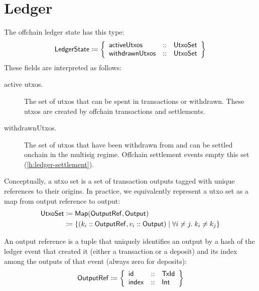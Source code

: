 \documentclass[../hydrozoa.tex]{subfiles}
\begin{document}
\section{Ledger}%
\label{h:offchain-ledger}

The offchain ledger state has this type:
\begin{equation*}
  \mathsf{LedgerState} \coloneq \left\{
  \begin{array}{lll}
    \mathsf{activeUtxos} &::& \mathsf{UtxoSet} \\
    \mathsf{withdrawnUtxos} &::& \mathsf{UtxoSet}
  \end{array}\right\}
\end{equation*}
These fields are interpreted as follows:
\begin{description}
  \item[active utxos.] The set of utxos that can be spent in transactions or withdrawn.
    These utxos are created by offchain transactions and settlements.
  \item[withdrawnUtxos.] The set of utxos that have been withdrawn from  and can be settled onchain in the multisig regime.
    Offchain settlement events empty this set (\cref{h:ledger-settlement}).
    
\end{description}

Conceptually, a utxo set is a set of transaction outputs tagged with unique references to their origins.
In practice, we equivalently represent a utxo set as a map from output reference to output:
\begin{equation*}
\begin{split}
  \mathsf{UtxoSet} &\coloneq \mathsf{Map(OutputRef, Output)} \\
    &\coloneq \left\{
      (k_i :: \mathsf{OutputRef}, v_i :: \mathsf{Output})
      \;\middle|\;
      \forall i \neq j.\; k_i \neq k_j
    \right\}
\end{split}
\end{equation*}

An output reference is a tuple that uniquely identifies an output by a hash of the ledger event that created it (either a transaction or a deposit) and its index among the outputs of that event (always zero for deposits):
\begin{equation*}
    \mathsf{OutputRef} \coloneq \left\{
    \begin{array}{lll}
      \mathsf{id} &::& \mathsf{TxId} \\
        \mathsf{index} &::& \mathsf{Int}
    \end{array} \right\}
\end{equation*}
\end{document}

